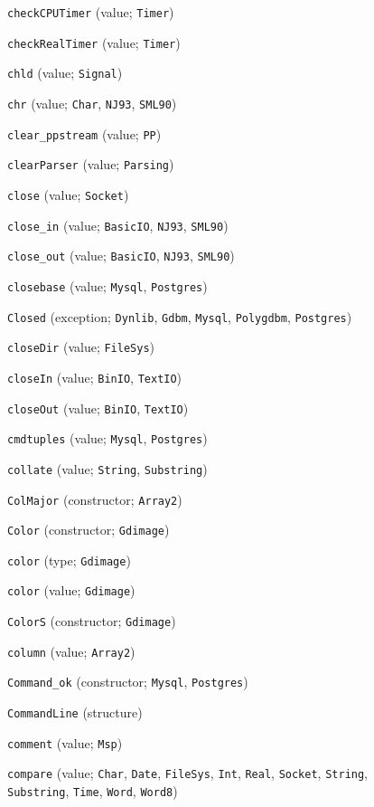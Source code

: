 \begin{description}
\item[] \verb"checkCPUTimer" (value; \verb"Timer")
\item[] \verb"checkRealTimer" (value; \verb"Timer")
\item[] \verb"chld" (value; \verb"Signal")
\item[] \verb"chr" (value; \verb"Char", \verb"NJ93", \verb"SML90")
\item[] \verb"clear_ppstream" (value; \verb"PP")
\item[] \verb"clearParser" (value; \verb"Parsing")
\item[] \verb"close" (value; \verb"Socket")
\item[] \verb"close_in" (value; \verb"BasicIO", \verb"NJ93", \verb"SML90")
\item[] \verb"close_out" (value; \verb"BasicIO", \verb"NJ93", \verb"SML90")
\item[] \verb"closebase" (value; \verb"Mysql", \verb"Postgres")
\item[] \verb"Closed" (exception; \verb"Dynlib", \verb"Gdbm", \verb"Mysql", \verb"Polygdbm", \verb"Postgres")
\item[] \verb"closeDir" (value; \verb"FileSys")
\item[] \verb"closeIn" (value; \verb"BinIO", \verb"TextIO")
\item[] \verb"closeOut" (value; \verb"BinIO", \verb"TextIO")
\item[] \verb"cmdtuples" (value; \verb"Mysql", \verb"Postgres")
\item[] \verb"collate" (value; \verb"String", \verb"Substring")
\item[] \verb"ColMajor" (constructor; \verb"Array2")
\item[] \verb"Color" (constructor; \verb"Gdimage")
\item[] \verb"color" (type; \verb"Gdimage")
\item[] \verb"color" (value; \verb"Gdimage")
\item[] \verb"ColorS" (constructor; \verb"Gdimage")
\item[] \verb"column" (value; \verb"Array2")
\item[] \verb"Command_ok" (constructor; \verb"Mysql", \verb"Postgres")
\item[] \verb"CommandLine" (structure)
\item[] \verb"comment" (value; \verb"Msp")
\item[] \verb"compare" (value; \verb"Char", \verb"Date", \verb"FileSys", \verb"Int", \verb"Real", \verb"Socket", \verb"String", \verb"Substring", \verb"Time", \verb"Word", \verb"Word8")

\end{description}
